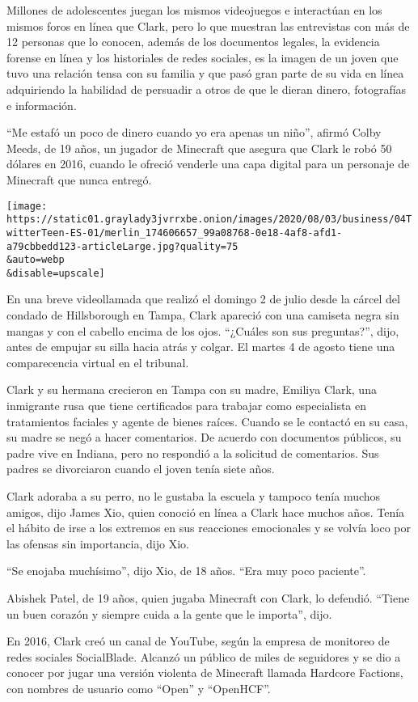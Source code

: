 Millones de adolescentes juegan los mismos videojuegos e interactúan en
los mismos foros en línea que Clark, pero lo que muestran las
entrevistas con más de 12 personas que lo conocen, además de los
documentos legales, la evidencia forense en línea y los historiales de
redes sociales, es la imagen de un joven que tuvo una relación tensa con
su familia y que pasó gran parte de su vida en línea adquiriendo la
habilidad de persuadir a otros de que le dieran dinero, fotografías e
información.

``Me estafó un poco de dinero cuando yo era apenas un niño'', afirmó
Colby Meeds, de 19 años, un jugador de Minecraft que asegura que Clark
le robó 50 dólares en 2016, cuando le ofreció venderle una capa digital
para un personaje de Minecraft que nunca entregó.

\texttt{[image: https://static01.graylady3jvrrxbe.onion/images/2020/08/03/business/04TwitterTeen-ES-01/merlin\_174606657\_99a08768-0e18-4af8-afd1-a79cbbedd123-articleLarge.jpg?quality=75\\\&auto=webp\\\&disable=upscale]}

En una breve videollamada que realizó el domingo 2 de julio desde la
cárcel del condado de Hillsborough en Tampa, Clark apareció con una
camiseta negra sin mangas y con el cabello encima de los ojos. ``¿Cuáles
son sus preguntas?'', dijo, antes de empujar su silla hacia atrás y
colgar. El martes 4 de agosto tiene una comparecencia virtual en el
tribunal.

Clark y su hermana crecieron en Tampa con su madre, Emiliya Clark, una
inmigrante rusa que tiene certificados para trabajar como especialista
en tratamientos faciales y agente de bienes raíces. Cuando se le
contactó en su casa, su madre se negó a hacer comentarios. De acuerdo
con documentos públicos, su padre vive en Indiana, pero no respondió a
la solicitud de comentarios. Sus padres se divorciaron cuando el joven
tenía siete años.

Clark adoraba a su perro, no le gustaba la escuela y tampoco tenía
muchos amigos, dijo James Xio, quien conoció en línea a Clark hace
muchos años. Tenía el hábito de irse a los extremos en sus reacciones
emocionales y se volvía loco por las ofensas sin importancia, dijo Xio.

``Se enojaba muchísimo'', dijo Xio, de 18 años. ``Era muy poco
paciente''.

Abishek Patel, de 19 años, quien jugaba Minecraft con Clark, lo
defendió. ``Tiene un buen corazón y siempre cuida a la gente que le
importa'', dijo.

En 2016, Clark creó un canal de YouTube, según la empresa de monitoreo
de redes sociales SocialBlade. Alcanzó un público de miles de seguidores
y se dio a conocer por jugar una versión violenta de Minecraft llamada
Hardcore Factions, con nombres de usuario como ``Open'' y ``OpenHCF''.

